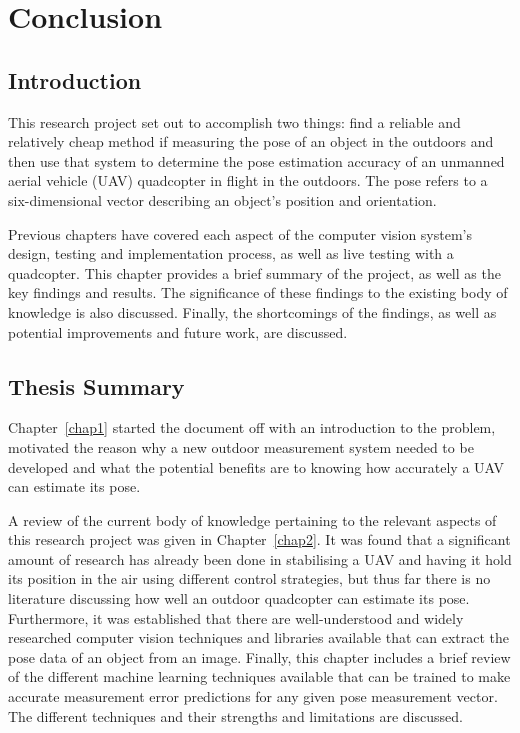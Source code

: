 \chapter{Conclusion}
\label{chap6}

\section{Introduction}

This research project set out to accomplish two things: find a reliable and relatively cheap method if measuring the pose of an object in the outdoors and then use that system to determine the pose estimation accuracy of an unmanned aerial vehicle (UAV) quadcopter in flight in the outdoors. The pose refers to a six-dimensional vector describing an object's position and orientation. 

Previous chapters have covered each aspect of the computer vision system's design, testing and implementation process, as well as live testing with a quadcopter. This chapter provides a brief summary of the project, as well as the key findings and results. The significance of these findings to the existing body of knowledge is also discussed. Finally, the shortcomings of the findings, as well as potential improvements and future work, are discussed. 

\section{Thesis Summary}

Chapter~\ref{chap1} started the document off with an introduction to the problem, motivated the reason why a new outdoor measurement system needed to be developed and what the potential benefits are to knowing how accurately a UAV can estimate its pose.  

A review of the current body of knowledge pertaining to the relevant aspects of this research project was given in Chapter~\ref{chap2}. It was found that a significant amount of research has already been done in stabilising a UAV and having it hold its position in the air using different control strategies, but thus far there is no literature discussing how well an outdoor quadcopter can estimate its pose. Furthermore, it was established that there are well-understood and widely researched computer vision techniques and libraries available that can extract the pose data of an object from an image. Finally, this chapter includes a brief review of the different machine learning techniques available that can be trained to make accurate measurement error predictions for any given pose measurement vector. The different techniques and their strengths and limitations are discussed.  

